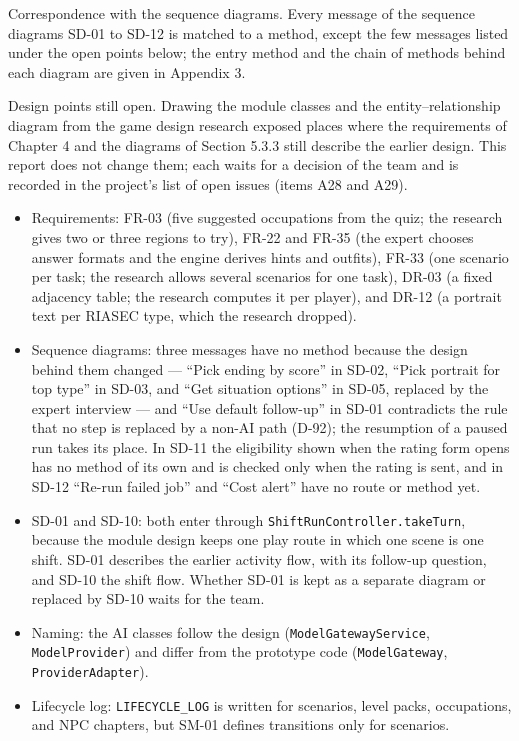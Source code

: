 Correspondence with the sequence diagrams. Every message of the sequence diagrams SD-01 to SD-12 is matched to a method, except the few messages listed under the open points below; the entry method and the chain of methods behind each diagram are given in Appendix 3.

Design points still open. Drawing the module classes and the entity--relationship diagram from the game design research exposed places where the requirements of Chapter 4 and the diagrams of Section 5.3.3 still describe the earlier design. This report does not change them; each waits for a decision of the team and is recorded in the project's list of open issues (items A28 and A29).

\begin{itemize}[leftmargin=1.5em]
  \item Requirements: FR-03 (five suggested occupations from the quiz; the research gives two or three regions to try), FR-22 and FR-35 (the expert chooses answer formats and the engine derives hints and outfits), FR-33 (one scenario per task; the research allows several scenarios for one task), DR-03 (a fixed adjacency table; the research computes it per player), and DR-12 (a portrait text per RIASEC type, which the research dropped).
  \item Sequence diagrams: three messages have no method because the design behind them changed --- ``Pick ending by score'' in SD-02, ``Pick portrait for top type'' in SD-03, and ``Get situation options'' in SD-05, replaced by the expert interview --- and ``Use default follow-up'' in SD-01 contradicts the rule that no step is replaced by a non-AI path (D-92); the resumption of a paused run takes its place. In SD-11 the eligibility shown when the rating form opens has no method of its own and is checked only when the rating is sent, and in SD-12 ``Re-run failed job'' and ``Cost alert'' have no route or method yet.
  \item SD-01 and SD-10: both enter through \texttt{ShiftRunController.\allowbreak{}takeTurn}, because the module design keeps one play route in which one scene is one shift. SD-01 describes the earlier activity flow, with its follow-up question, and SD-10 the shift flow. Whether SD-01 is kept as a separate diagram or replaced by SD-10 waits for the team.
  \item Naming: the AI classes follow the design (\texttt{ModelGatewayService}, \texttt{ModelProvider}) and differ from the prototype code (\texttt{ModelGateway}, \texttt{ProviderAdapter}).
  \item Lifecycle log: \texttt{LIFECYCLE\_\allowbreak{}LOG} is written for scenarios, level packs, occupations, and NPC chapters, but SM-01 defines transitions only for scenarios.
\end{itemize}

